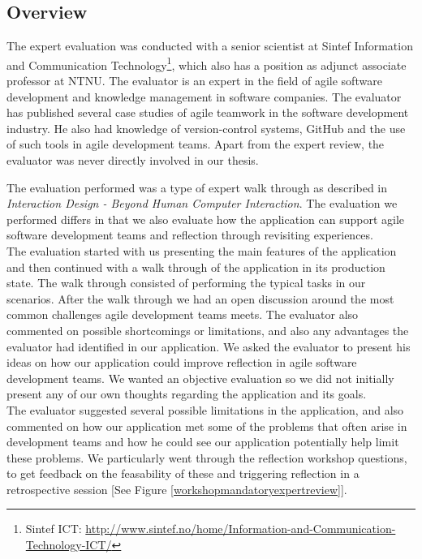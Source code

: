 \subsection{Overview}
The expert evaluation was conducted with a senior scientist at Sintef Information and Communication Technology\footnote{Sintef ICT: \url{http://www.sintef.no/home/Information-and-Communication-Technology-ICT/}}, which also has a position as adjunct associate professor at NTNU. The evaluator is an expert in the field of agile software development and knowledge management in software companies. The evaluator has published several case studies of agile teamwork in the software development industry. He also had knowledge of version-control systems, GitHub and the use of such tools in agile development teams. Apart from the expert review, the evaluator was never directly involved in our thesis.

The evaluation performed was a type of expert walk through as described in \emph{Interaction Design - Beyond Human Computer Interaction}\cite{rogers2011interaction}. The evaluation we performed differs in that we also evaluate how the application can support agile software development teams and reflection through revisiting experiences. \\ 
The evaluation started with us presenting the main features of the application and then continued with a walk through of the application in its production state. The walk through consisted of performing the typical tasks in our scenarios. After the walk through we had an open discussion around the most common challenges agile development teams meets.  The evaluator also commented on possible shortcomings or limitations, and also any advantages the evaluator had identified in our application. We asked the evaluator to present his ideas on how our application could improve reflection in agile software development teams. We wanted an objective evaluation so we did not initially present any of our own thoughts regarding the application and its goals. \\

The evaluator suggested several possible limitations in the application, and also commented on how our application met some of the problems that often arise in development teams and how he could see our application potentially help limit these problems. We particularly went through the reflection workshop questions, to get feedback on the feasability of these and triggering reflection in a retrospective session [See Figure \ref{workshopmandatoryexpertreview}]. 

